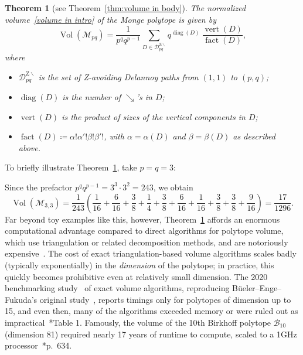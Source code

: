 \documentclass[noamsfonts,10pt]{amsart}
\newcommand{\M}{\mathcal{M}}
\newcommand{\DZ}{\mathcal{D}^{\mathrm{Z} \!\!\!\! \backslash}}
\newcommand{\al}{\alpha}
\newcommand{\be}{\beta}
\newcommand{\dd}{\operatorname{diag}}
\newcommand{\vv}{\operatorname{vert}}
\newcommand{\ff}{\operatorname{fact}}
\DeclareMathOperator{\Vol}{Vol}
\newcommand{\1}{\mathbf{1}}
\theoremstyle{plain}
\newtheorem{maintheorem}{Theorem}
\theoremstyle{definition}
\numberwithin{equation}{section}
\begin{document}
\begin{maintheorem}[see Theorem~\ref{thm:volume in body}]
    \label{thm:volume in intro}
    The normalized volume~\eqref{volume in intro} of the Monge polytope is given by
    \[
        \Vol(\M_{pq}) = \frac{1}{p^q q^{p-1}} \sum_{D \in \DZ_{pq}} q^{\dd(D)} \: \frac{\vv(D)}{\ff(D)},
    \]
    where
    \begin{itemize}
        \item[] $\DZ_{pq}$ is the set of Z-avoiding Delannoy paths from $(1,1)$ to $(p,q)$;
        \item[] $\dd(D)$ is the number of $\searrow$'s in $D$;
        \item[] $\vv(D)$ is the product of sizes of the vertical components in $D$;
        \item[] $\ff(D) \coloneqq \al! \al'! \be! \be'!$, with $\al = \al(D)$ and $\be = \be(D)$ as described above.
    \end{itemize}
\end{maintheorem}

To briefly illustrate Theorem~\ref{thm:volume in intro}, take $p=q=3$:

Since the prefactor $p^q q^{p-1} = 3^3 \cdot 3^2 = 243$, we obtain
\[
    \Vol(\M_{3,3}) = \frac{1}{243} \left( \frac{1}{16} + \frac{6}{16} + \frac{3}{8} + \frac{1}{4} + \frac{3}{8} + \frac{6}{16} + \frac{1}{16} + \frac{3}{8} + \frac{3}{8} + \frac{9}{16} \right) = \frac{17}{1296}.
\]
Far beyond toy examples like this, however, Theorem~\ref{thm:volume in intro} affords an enormous computational advantage compared to direct algorithms for polytope volume, which use triangulation or related decomposition methods, and are notoriously expensive~\cite{GK}.
The cost of exact triangulation-based volume algorithms scales badly (typically exponentially) in the \emph{dimension} of the polytope;
in practice, this quickly becomes prohibitive even at relatively small dimension.
The 2020 benchmarking study~\cite{Enge} of exact volume algorithms, reproducing B\"ueler--Enge--Fukuda's original study~\cite{BEF}, reports timings only for polytopes of dimension up to 15, and even then, many of the algorithms exceeded memory or were ruled out as impractical~\cite{Enge}*{Table 1}.
Famously, the volume of the 10th Birkhoff polytope $\mathcal{B}_{10}$ (dimension 81) required nearly 17 years of runtime to compute, scaled to a 1GHz processor~\cite{BeckPixton03}*{p.~634}.
\end{document}
